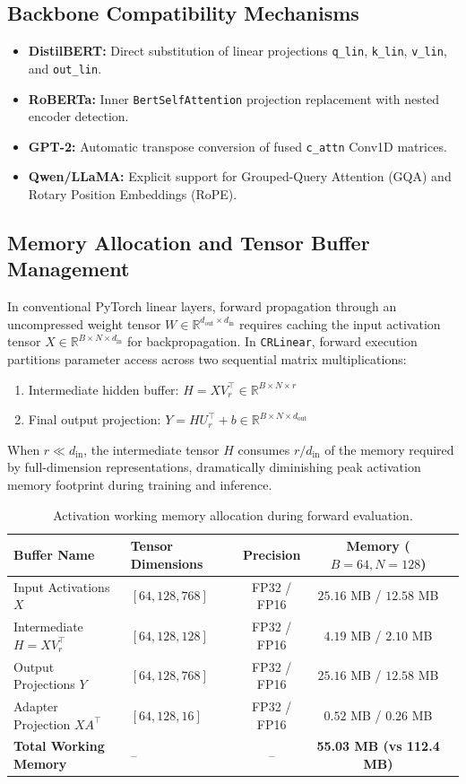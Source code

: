 \subsection{Backbone Compatibility Mechanisms}
\begin{itemize}
\item \textbf{DistilBERT:} Direct substitution of linear projections \texttt{q\_lin}, \texttt{k\_lin}, \texttt{v\_lin}, and \texttt{out\_lin}.
\item \textbf{RoBERTa:} Inner \texttt{BertSelfAttention} projection replacement with nested encoder detection.
\item \textbf{GPT-2:} Automatic transpose conversion of fused \texttt{c\_attn} Conv1D matrices.
\item \textbf{Qwen/LLaMA:} Explicit support for Grouped-Query Attention (GQA) and Rotary Position Embeddings (RoPE).
\end{itemize}

\subsection{Memory Allocation and Tensor Buffer Management}
In conventional PyTorch linear layers, forward propagation through an uncompressed weight tensor $W \in \mathbb{R}^{d_{\text{out}} \times d_{\text{in}}}$ requires caching the input activation tensor $X \in \mathbb{R}^{B \times N \times d_{\text{in}}}$ for backpropagation. In \texttt{CRLinear}, forward execution partitions parameter access across two sequential matrix multiplications:
\begin{enumerate}
\item Intermediate hidden buffer: $H = X V_r^\top \in \mathbb{R}^{B \times N \times r}$
\item Final output projection: $Y = H U_r^\top + b \in \mathbb{R}^{B \times N \times d_{\text{out}}}$
\end{enumerate}
When $r \ll d_{\text{in}}$, the intermediate tensor $H$ consumes $r / d_{\text{in}}$ of the memory required by full-dimension representations, dramatically diminishing peak activation memory footprint during training and inference.

\begin{table}[H]
\centering
\small
\begin{tabular}{llccc}
\toprule
\textbf{Buffer Name} & \textbf{Tensor Dimensions} & \textbf{Precision} & \textbf{Memory ($B=64, N=128$)} \\
\midrule
Input Activations $X$ & $[64, 128, 768]$ & FP32 / FP16 & $25.16$ MB / $12.58$ MB \\
Intermediate $H = X V_r^\top$ & $[64, 128, 128]$ & FP32 / FP16 & $4.19$ MB / $2.10$ MB \\
Output Projections $Y$ & $[64, 128, 768]$ & FP32 / FP16 & $25.16$ MB / $12.58$ MB \\
Adapter Projection $X A^\top$ & $[64, 128, 16]$ & FP32 / FP16 & $0.52$ MB / $0.26$ MB \\
\midrule
\textbf{Total Working Memory} & -- & -- & \textbf{55.03 MB (vs 112.4 MB)} \\
\bottomrule
\end{tabular}
\caption{Activation working memory allocation during forward evaluation.}
\end{table}
